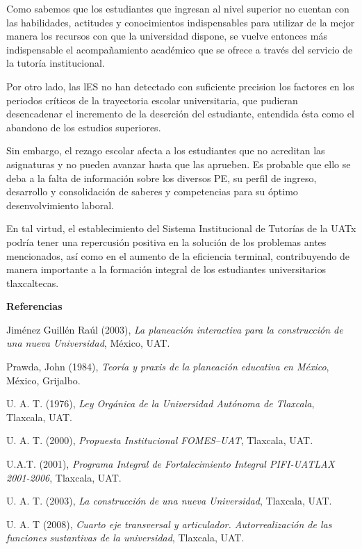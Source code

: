 Como sabemos que los estudiantes que ingresan al nivel superior no cuentan con las habilidades, actitudes y conocimientos indispensables para utilizar de la mejor manera los recursos con que la universidad dispone,  se vuelve entonces más indispensable el acompañamiento académico que se ofrece a través del servicio de la tutoría institucional.

Por otro  lado,  las  lES  no  han detectado con  suficiente precision los factores en los periodos críticos de la trayectoria escolar  universitaria, que  pudieran desencadenar el incremento de la deserción del  estudiante,  entendida  ésta  como  el  abandono  de  los  estudios superiores.

Sin embargo, el rezago escolar afecta a los estudiantes que no acreditan las asignaturas y no pueden avanzar hasta que las aprueben. Es probable que ello se deba a la falta de información sobre los diversos PE, su perfil de ingreso, desarrollo y consolidación de saberes y competencias para su óptimo desenvolvimiento laboral. 

\enlargethispage{1\baselineskip}
En tal virtud, el establecimiento del Sistema Institucional de Tutorías de la UATx podría tener una repercusión positiva en la solución de los problemas antes mencionados, así como en el aumento de la eficiencia terminal, contribuyendo de manera importante a la formación integral de los estudiantes universitarios tlaxcaltecas.
\newpage

\textbf{Referencias}

\medskip
Jiménez Guillén Raúl (2003),  \textit{La planeación interactiva para la construcción de una nueva Universidad},  México, UAT.

Prawda, John (1984), \textit{Teoría y praxis de la planeación educativa en México}, México, Grijalbo.

U. A. T. (1976),  \textit{Ley Orgánica de la Universidad Autónoma de Tlaxcala}, Tlaxcala, UAT.

U. A. T. (2000), \textit{Propuesta Institucional FOMES--UAT},  Tlaxcala, UAT.

 U.A.T. (2001), \textit{Programa Integral de Fortalecimiento Integral PIFI-UATLAX 2001-2006}, Tlaxcala, UAT.
              
U. A. T. (2003), \textit{La construcción de una nueva Universidad}, Tlaxcala, UAT.

U. A. T (2008), \textit{Cuarto eje transversal y articulador. Autorrealización de las funciones sustantivas de la universidad}, Tlaxcala, UAT.

